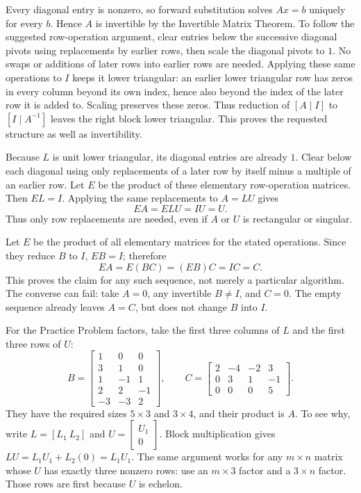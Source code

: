 Every diagonal entry is nonzero, so forward substitution solves
$Ax=b$ uniquely for every $b$. Hence $A$ is invertible by the
Invertible Matrix Theorem.
To follow the suggested row-operation argument, clear entries below
the successive diagonal pivots using replacements by earlier rows,
then scale the diagonal pivots to $1$. No swaps or additions of later
rows into earlier rows are needed. Applying these same operations to
$I$ keeps it lower triangular: an earlier lower triangular row has
zeros in every column beyond its own index, hence also beyond the
index of the later row it is added to. Scaling preserves these zeros.
Thus reduction of $[A\mid I]$ to $[I\mid A^{-1}]$ leaves the right
block lower triangular. This proves the requested structure as well
as invertibility.

Because $L$ is unit lower triangular, its diagonal entries are already
$1$. Clear below each diagonal using only replacements of a later row
by itself minus a multiple of an earlier row. Let $E$ be the product
of these elementary row-operation matrices. Then $EL=I$.
Applying the same replacements to $A=LU$ gives
\[EA=ELU=IU=U.\]
Thus only row replacements are needed, even if $A$ or $U$ is
rectangular or singular.

Let $E$ be the product of all elementary matrices for the stated
operations. Since they reduce $B$ to $I$, $EB=I$; therefore
\[EA=E(BC)=(EB)C=IC=C.\]
This proves the claim for any such sequence, not merely a particular
algorithm. The converse can fail: take $A=0$, any invertible $B\ne I$,
and $C=0$. The empty sequence already leaves $A=C$, but does not
change $B$ into $I$.

For the Practice Problem factors, take the first three columns of
$L$ and the first three rows of $U$:
\[B=\left[\begin{matrix}1 & 0 & 0\\3 & 1 & 0\\1 & -1 & 1\\2 & 2 & -1\\-3 & -3 & 2\end{matrix}\right],\qquad C=\left[\begin{matrix}2 & -4 & -2 & 3\\0 & 3 & 1 & -1\\0 & 0 & 0 & 5\end{matrix}\right].\]
They have the required sizes $5\times3$ and $3\times4$, and their
product is $A$. To see why, write
$L=[L_1\ L_2]$ and $U=\begin{bmatrix}U_1\\0\end{bmatrix}$.
Block multiplication gives $LU=L_1U_1+L_2(0)=L_1U_1$.
The same argument works for any $m\times n$ matrix whose $U$ has
exactly three nonzero rows: use an $m\times3$ factor and a
$3\times n$ factor. Those rows are first because $U$ is echelon.

